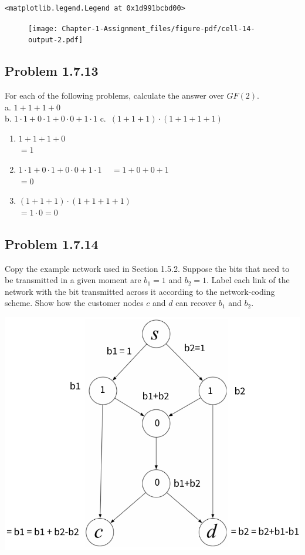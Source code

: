 \documentclass[
  letterpaper,
  DIV=11,
  numbers=noendperiod]{scrartcl}
\providecommand{\tightlist}{%
  \setlength{\itemsep}{0pt}\setlength{\parskip}{0pt}}\usepackage{longtable,booktabs,array}
\begin{document}
\begin{verbatim}
<matplotlib.legend.Legend at 0x1d991bcbd00>
\end{verbatim}

\begin{figure}[H]

{\centering \texttt{[image: Chapter-1-Assignment\_files/figure-pdf/cell-14-output-2.pdf]}

}

\end{figure}

\hypertarget{problem-1.7.13}{%
\subsection{Problem 1.7.13}\label{problem-1.7.13}}

For each of the following problems, calculate the answer over
\(GF(2)\).\\
a. \(1 + 1 + 1 + 0\)\\
b. \(1 \cdot 1 + 0 \cdot 1 + 0 \cdot 0 + 1 \cdot 1\)
c.~\((1 + 1 + 1) \cdot (1 + 1 + 1 + 1)\)

\begin{enumerate}
\def\labelenumi{\alph{enumi}.}
\tightlist
\item
  \(1 + 1 + 1 + 0\)\\
  \(=1\)\\
\item
  \(1 \cdot 1 + 0 \cdot 1 + 0 \cdot 0 + 1 \cdot 1\) ~
  \(= 1 + 0 + 0 + 1\)\\
  \(= 0\)\\
\item
  \((1 + 1 + 1) \cdot (1 + 1 + 1 + 1)\)\\
  \(= 1 \cdot 0 = 0\)\\
\end{enumerate}

\hypertarget{problem-1.7.14}{%
\subsection{Problem 1.7.14}\label{problem-1.7.14}}

Copy the example network used in Section 1.5.2. Suppose the bits that
need to be transmitted in a given moment are \(b_1 = 1\) and
\(b_2 = 1\). Label each link of the network with the bit transmitted
across it according to the network-coding scheme. Show how the customer
nodes \(c\) and \(d\) can recover \(b_1\) and \(b_2\).

\includegraphics{images/image-107878324.png}
\end{document}
